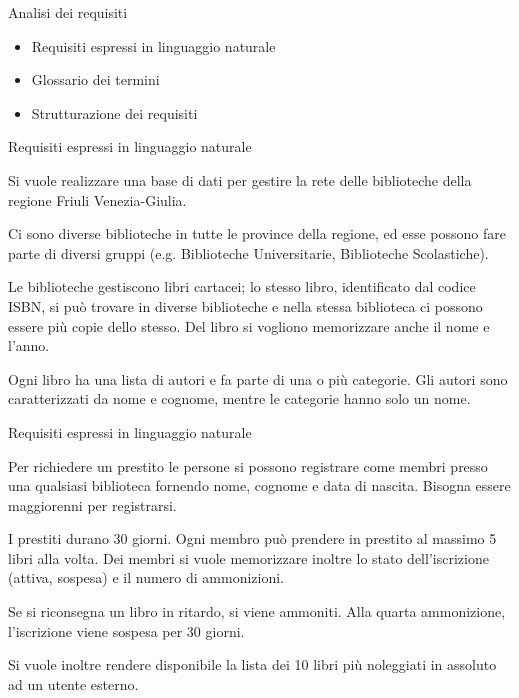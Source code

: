 \frame{\titlepage}

\begin{frame}{Analisi dei requisiti}
    \begin{itemize}
        \item Requisiti espressi in linguaggio naturale
        \item Glossario dei termini
        \item Strutturazione dei requisiti
    \end{itemize}
\end{frame}

\begin{frame}[t]{Requisiti espressi in linguaggio naturale}
    \begin{shadequote}[r]{}
        \small
        Si vuole realizzare una base di dati per gestire la rete delle biblioteche della regione Friuli Venezia-Giulia.
        
        Ci sono diverse biblioteche in tutte le province della regione, ed esse possono fare parte di diversi gruppi (e.g. Biblioteche Universitarie, Biblioteche Scolastiche).
        
        Le biblioteche gestiscono libri cartacei; lo stesso libro, identificato dal codice ISBN, si può trovare in diverse biblioteche e nella stessa biblioteca ci possono essere più copie dello stesso. Del libro si vogliono memorizzare anche il nome e l'anno.
        
        Ogni libro ha una lista di autori e fa parte di una o più categorie. Gli autori sono caratterizzati da nome e cognome, mentre le categorie hanno solo un nome.
    \end{shadequote}
\end{frame}

\begin{frame}[t]{Requisiti espressi in linguaggio naturale}
    \begin{shadequote}[r]{}
        \small
        Per richiedere un prestito le persone si possono registrare come membri presso una qualsiasi biblioteca fornendo nome, cognome e data di nascita. Bisogna essere maggiorenni per registrarsi. 

        I prestiti durano 30 giorni. Ogni membro può prendere in prestito al massimo 5 libri alla volta. Dei membri si vuole memorizzare inoltre lo stato dell'iscrizione (attiva, sospesa) e il numero di ammonizioni.

        Se si riconsegna un libro in ritardo, si viene ammoniti. Alla quarta ammonizione, l'iscrizione viene sospesa per 30 giorni.

        Si vuole inoltre rendere disponibile la lista dei 10 libri più noleggiati in assoluto ad un utente esterno.
    \end{shadequote}
\end{frame}

